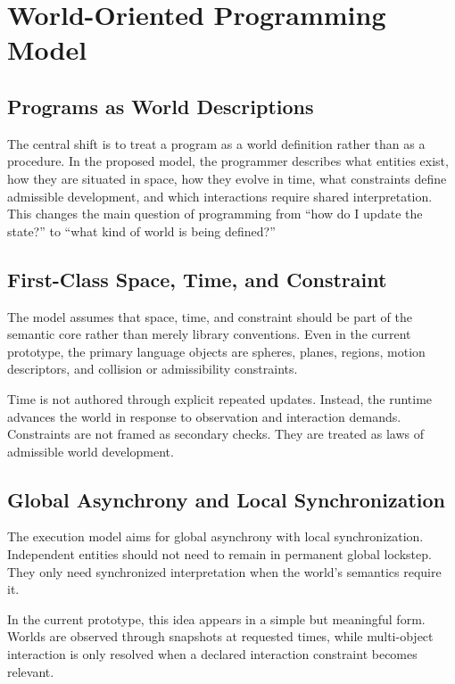 \documentclass[sigplan,review,anonymous]{acmart}
\begin{document}
\section{World-Oriented Programming Model}

\subsection{Programs as World Descriptions}

The central shift is to treat a program as a world definition rather than as a procedure.
In the proposed model, the programmer describes what entities exist, how they are situated in space, how they evolve in time, what constraints define admissible development, and which interactions require shared interpretation.
This changes the main question of programming from ``how do I update the state?'' to ``what kind of world is being defined?''

\subsection{First-Class Space, Time, and Constraint}

The model assumes that space, time, and constraint should be part of the semantic core rather than merely library conventions.
Even in the current prototype, the primary language objects are spheres, planes, regions, motion descriptors, and collision or admissibility constraints.

Time is not authored through explicit repeated updates.
Instead, the runtime advances the world in response to observation and interaction demands.
Constraints are not framed as secondary checks.
They are treated as laws of admissible world development.

\subsection{Global Asynchrony and Local Synchronization}

The execution model aims for global asynchrony with local synchronization.
Independent entities should not need to remain in permanent global lockstep.
They only need synchronized interpretation when the world's semantics require it.

In the current prototype, this idea appears in a simple but meaningful form.
Worlds are observed through snapshots at requested times, while multi-object interaction is only resolved when a declared interaction constraint becomes relevant.
\end{document}
